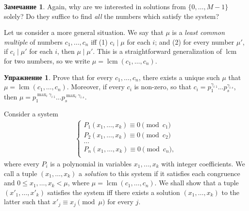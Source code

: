 \documentclass[12pt,notitlepage]{article}
\theoremstyle{plain}
\theoremstyle{definition}
\newtheorem{exc}[thm]{Упражнение}
\newtheorem{rem}[thm]{Замечание}
\theoremstyle{plain}
\newcommand{\1}{\mathbf{1}}
\newcommand{\0}{\mathbf{0}}
\newcommand{\dvd}{\mathop{\mid}}
\DeclareMathOperator{\lcm}{lcm}
\begin{document}
\begin{rem}
	Again, why are we interested in solutions from $\{0, \ldots, M-1\}$ solely? Do they suffice to find \emph{all} the numbers which satisfy the system?
	
	Let us consider a more general situation. We say that $\mu$ is a \emph{least common multiple} of numbers $c_1,\ldots,c_n$ iff (1) $c_i \dvd \mu$ for each $i$; and (2) for every number $\mu'$, if $c_i \dvd \mu'$ for each $i$, then $\mu \dvd \mu'$. This is a straightforward generalization of ${\lcm}$ for two numbers, so we write $\mu = \lcm(c_1,\ldots,c_n)$.
	
	\begin{exc}\label{exc_n_lcm}
		Prove that for every $c_1, \ldots, c_n$, there exists a unique such $\mu$ that $\mu = \lcm(c_1,\ldots,c_n)$. Moreover, if every $c_i$ is non-zero, so that $c_i = p^{\gamma_{i\; 1}}_1 \ldots p^{\gamma_{i\; s}}_s$, then $\mu = p^{\max_i \gamma_{i\; 1}}_1 \ldots p^{\max_i \gamma_{i\; s}}_s$.
	\end{exc}
	
	\noindent Consider a system 
	\begin{equation*}
		\begin{array}{l}
			\begin{cases}
				P_1(x_1, \ldots, x_k) \equiv 0 \pmod {c_1}\\
				P_2(x_1, \ldots, x_k) \equiv 0 \pmod {c_2}\\
				\ldots\\
				P_n(x_1, \ldots, x_k) \equiv 0 \pmod {c_n},\\
			\end{cases}
		\end{array}
	\end{equation*}
	where every $P_i$ is a polynomial in variables $x_1,\ldots,x_k$ with integer coefficients. We call a tuple $(x_1, \ldots, x_k)$ a \emph{solution} to this system if it satisfies each congruence and $0 \leq x_1, \ldots, x_k < \mu$, where $\mu = \lcm(c_1, \ldots, c_n)$. We shall show that a tuple $(x'_1, \ldots, x'_k)$ satisfies the system iff there exists a solution $(x_1, \ldots, x_k)$ to the latter such that $x'_j \equiv x_j \pmod \mu$ for every $j$.
	

\end{rem}
\end{document}
